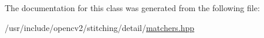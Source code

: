 The documentation for this class was generated from the following file\-:\begin{DoxyCompactItemize}
\item 
/usr/include/opencv2/stitching/detail/\hyperlink{matchers_8hpp}{matchers.\-hpp}\end{DoxyCompactItemize}
